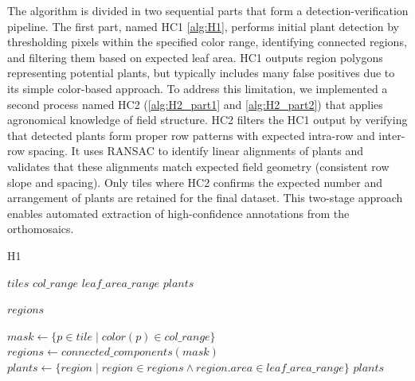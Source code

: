 \documentclass[12pt,a4paper,oneside]{report}
\begin{document}
The algorithm is divided in two sequential parts that form a detection-verification pipeline. The first part,
named HC1 \cref{alg:H1}, performs initial plant detection by thresholding pixels within the specified color range, 
identifying connected regions, and filtering them based on expected leaf area. HC1 outputs region polygons
representing potential plants, but typically includes many false positives due to its simple color-based approach.
To address this limitation, we implemented a second process named HC2 (\cref{alg:H2_part1} and \cref{alg:H2_part2}) that applies agronomical 
knowledge of field structure. HC2 filters the HC1 output by verifying that detected plants form proper row 
patterns with expected intra-row and inter-row spacing. It uses RANSAC to identify linear alignments of plants 
and validates that these alignments match expected field geometry (consistent row slope and spacing).
Only tiles where HC2 confirms the expected number and arrangement of plants are retained for the final dataset.
This two-stage approach enables automated extraction of high-confidence annotations from the orthomosaics.

\begingroup
\small
\begin{algorithm}
    \caption{H1}
    \label{alg:H1}
    \begin{algorithmic}[1]
    \Require $tiles$ 
    \Require $col\_range$ 
    \Require $leaf\_area\_range$ 
    \Ensure $plants$ 
    
     \cite{wuOptimizingConnectedComponent2005} 
        \State \Return $regions$
    \EndFunction
    
      \State $mask \gets \{p \in tile \mid color(p) \in col\_range\}$
      \State $regions \gets connected\_components(mask)$
      \State $plants \gets \{region \mid region \in regions \land region.area \in leaf\_area\_range\}$
    \EndFor
    \State \Return $plants$
  \end{algorithmic}
  \end{algorithm}
  
\end{document}
